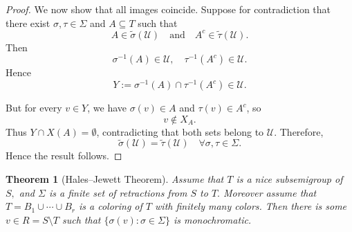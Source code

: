 \documentclass[12pt]{amsart}
\newtheorem{theorem}{Theorem}
\begin{document}
\begin{proof}
We now show that all images coincide. Suppose for contradiction that there exist $\sigma,\tau \in \Sigma$ and $A \subseteq T$ such that
\[
A \in \widetilde{\sigma}(\mathcal{U}) \quad \text{and} \quad A^c \in \widetilde{\tau}(\mathcal{U}).
\]
Then
\[
\sigma^{-1}(A) \in \mathcal{U}, \quad \tau^{-1}(A^c) \in \mathcal{U}.
\]
Hence
\[
Y := \sigma^{-1}(A) \cap \tau^{-1}(A^c) \in \mathcal{U}.
\]

But for every $v \in Y$, we have $\sigma(v) \in A$ and $\tau(v) \in A^c$, so
\[
v \notin X_A.
\]
Thus $Y \cap X(A) = \emptyset$, contradicting that both sets belong to $\mathcal{U}$. Therefore,
\[
\widetilde{\sigma}(\mathcal{U}) = \widetilde{\tau}(\mathcal{U}) \quad \forall \sigma,\tau \in \Sigma.
\]
Hence the result follows.
\end{proof}

\begin{theorem}[Hales--Jewett Theorem]
Assume that $T$ is a nice subsemigroup of $S,$ and $\Sigma$ is a finite set of retractions from $S$ to $T.$ Moreover assume that $T=B_1 \cup \cdots \cup B_r$ is a coloring of $T$ with finitely many colors. Then there is some $v \in R=S \setminus T$ such that $\{\sigma(v) : \sigma \in \Sigma\}$ is monochromatic.
\end{theorem}
\end{document}
